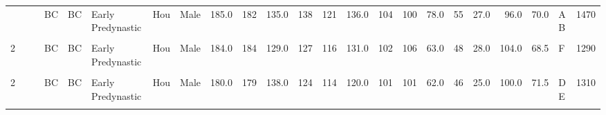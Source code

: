 \begin{table}[p]
{\begin{tabular}{rrrlllllrrrrrrrrrrrrrlr}
\addlinespace
2 &  &  & BC & BC & Early Predynastic & Hou & Male & 185.0 & 182 & 135.0 & 138 & 121 & 136.0 & 104 & 100 & 78.0 & 55 & 27.0 & 96.0 & 70.0 & A B & 1470\\
\cellcolor{gray!10}{2} & \cellcolor{gray!10}{} & \cellcolor{gray!10}{} & \cellcolor{gray!10}{BC} & \cellcolor{gray!10}{BC} & \cellcolor{gray!10}{Early Predynastic} & \cellcolor{gray!10}{Hou} & \cellcolor{gray!10}{Male} & \cellcolor{gray!10}{184.0} & \cellcolor{gray!10}{184} & \cellcolor{gray!10}{132.0} & \cellcolor{gray!10}{128} & \cellcolor{gray!10}{106} & \cellcolor{gray!10}{117.0} & \cellcolor{gray!10}{97} & \cellcolor{gray!10}{93} & \cellcolor{gray!10}{72.0} & \cellcolor{gray!10}{53} & \cellcolor{gray!10}{25.0} & \cellcolor{gray!10}{96.0} & \cellcolor{gray!10}{70.5} & \cellcolor{gray!10}{A B} & \cellcolor{gray!10}{1320}\\
2 &  &  & BC & BC & Early Predynastic & Hou & Male & 184.0 & 184 & 129.0 & 127 & 116 & 131.0 & 102 & 106 & 63.0 & 48 & 28.0 & 104.0 & 68.5 & F & 1290\\
\cellcolor{gray!10}{2} & \cellcolor{gray!10}{} & \cellcolor{gray!10}{} & \cellcolor{gray!10}{BC} & \cellcolor{gray!10}{BC} & \cellcolor{gray!10}{Early Predynastic} & \cellcolor{gray!10}{Hou} & \cellcolor{gray!10}{Male} & \cellcolor{gray!10}{185.0} & \cellcolor{gray!10}{183} & \cellcolor{gray!10}{136.0} & \cellcolor{gray!10}{131} & \cellcolor{gray!10}{117} & \cellcolor{gray!10}{129.0} & \cellcolor{gray!10}{111} & \cellcolor{gray!10}{114} & \cellcolor{gray!10}{73.0} & \cellcolor{gray!10}{54} & \cellcolor{gray!10}{27.0} & \cellcolor{gray!10}{103.0} & \cellcolor{gray!10}{68.5} & \cellcolor{gray!10}{E F} & \cellcolor{gray!10}{1400}\\
2 &  &  & BC & BC & Early Predynastic & Hou & Male & 180.0 & 179 & 138.0 & 124 & 114 & 120.0 & 101 & 101 & 62.0 & 46 & 25.0 & 100.0 & 71.5 & D E & 1310\\
\addlinespace
\cellcolor{gray!10}{2} & \cellcolor{gray!10}{} & \cellcolor{gray!10}{} & \cellcolor{gray!10}{BC} & \cellcolor{gray!10}{BC} & \cellcolor{gray!10}{Early Predynastic} & \cellcolor{gray!10}{Hou} & \cellcolor{gray!10}{Male} & \cellcolor{gray!10}{181.0} & \cellcolor{gray!10}{180} & \cellcolor{gray!10}{139.0} & \cellcolor{gray!10}{131} & \cellcolor{gray!10}{113} & \cellcolor{gray!10}{121.0} & \cellcolor{gray!10}{98} & \cellcolor{gray!10}{92} & \cellcolor{gray!10}{71.0} & \cellcolor{gray!10}{53} & \cellcolor{gray!10}{24.0} & \cellcolor{gray!10}{94.0} & \cellcolor{gray!10}{73.0} & \cellcolor{gray!10}{A} & \cellcolor{gray!10}{1400}\\

\end{tabular}}
\end{table}
